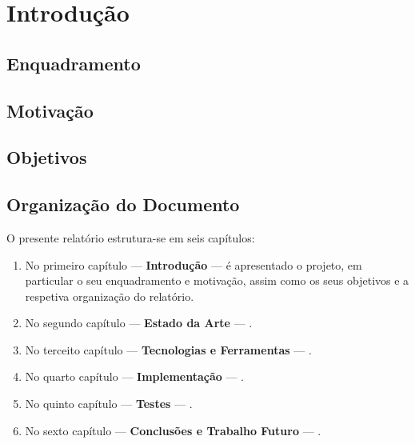 \chapter{Introdução}
\label{ch::intro}

\section{Enquadramento}
\label{sec::intro:enquadramento}


\section{Motivação}
\label{sec::intro:motivacao}


\section{Objetivos}
\label{sec::intro:objetivos}


\section{Organização do Documento}
\label{sec::intro:orgdoc}

O presente relatório estrutura-se em seis capítulos:

\begin{enumerate}
	\item No primeiro capítulo --- \textbf{Introdução} --- é apresentado o projeto, em particular o seu enquadramento e motivação, assim como os seus objetivos e a respetiva organização do relatório.
	
	\item No segundo capítulo --- \textbf{Estado da Arte} --- .
	
	\item No terceito capítulo --- \textbf{Tecnologias e Ferramentas} --- .
	
	\item No quarto capítulo --- \textbf{Implementação} --- .
	
	\item No quinto capítulo --- \textbf{Testes} --- .
	
	\item No sexto capítulo --- \textbf{Conclusões e Trabalho Futuro} --- .
\end{enumerate}
